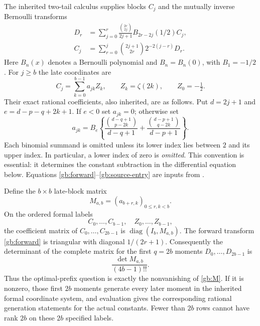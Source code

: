 The inherited two-tail calculus supplies blocks $C_j$ and the mutually
inverse Bernoulli transforms
\begin{align}
 D_r&=\sum_{j=0}^r\frac{\binom{2r}{2j}}{2j+1}
          B_{2r-2j}(1/2)C_j,\label{gb:forward}\\
 C_j&=\sum_{r=0}^j\binom{2j+1}{2r}2^{-2(j-r)}D_r.
 \label{gb:inverse}
\end{align}
Here $B_n(x)$ denotes a Bernoulli polynomial and $B_n=B_n(0)$, with
$B_1=-1/2$.  For $j\ge b$ the late coordinates are
\begin{equation}\label{gb:late}
 C_j=\sum_{k=0}^{b-1}a_{jk}Z_k,\qquad
 Z_k=\zeta(2k),\qquad Z_0=-\tfrac12.
\end{equation}
Their exact rational coefficients, also inherited, are as follows.
Put $d=2j+1$ and $e=d-p-q+2k+1$.  If $e<0$ set $a_{jk}=0$;
otherwise set
\begin{equation}\label{gb:source-entry}
 a_{jk}=B_e\left\{
 \frac{\binom{d-q+1}{p-2k}}{d-q+1}
 +\frac{\binom{d-p+1}{q-2k}}{d-p+1}\right\}.
\end{equation}
Each binomial summand is omitted unless its lower index lies between
$2$ and its upper index.  In particular, a lower index of zero is
\emph{omitted}.  This convention is essential: it determines the
constant subtraction in the differential equation below.  Equations
\eqref{gb:forward}--\eqref{gb:source-entry} are inputs from
\cite[Section~2, inherited moment coordinates]{repo-gamma}.

Define the $b\times b$ late-block matrix
\begin{equation}\label{gb:M}
 M_{a,b}=(a_{b+r,k})_{0\le r,k<b}.
\end{equation}
On the ordered formal labels
\[
 C_0,\ldots,C_{b-1},\quad Z_0,\ldots,Z_{b-1},
\]
the coefficient matrix of $C_0,\ldots,C_{2b-1}$ is
$\operatorname{diag}(I_b,M_{a,b})$.  The forward transform
\eqref{gb:forward} is triangular with diagonal $1/(2r+1)$.
Consequently the determinant of the complete matrix for the first
$q=2b$ moments $D_0,\ldots,D_{2b-1}$ is
\begin{equation}\label{gb:full-prefix}
             \frac{\det M_{a,b}}{(4b-1)!!}.
\end{equation}
Thus the optimal-prefix question is exactly the nonvanishing of
\eqref{gb:M}.  If it is nonzero, those first $2b$ moments generate
every later moment in the inherited formal coordinate system, and
evaluation gives the corresponding rational generation statements for
the actual constants.  Fewer than $2b$ rows cannot have rank $2b$ on
these $2b$ specified labels.

